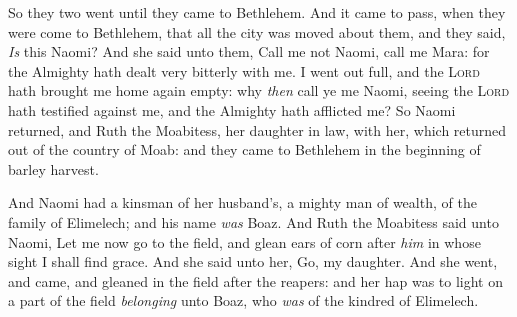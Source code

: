 \documentclass[11pt,letterpaper,oneside]{memoir}
\begin{document}
So they two went until they came to Bethlehem. And it came to pass, when 
they were come to Bethlehem, that all the city was moved about them, and 
they said, \emph{Is} this Naomi? And she said unto them, Call me not 
Naomi, call me Mara: for the Almighty hath dealt very bitterly with me. 
I went out full, and the \textsc{Lord} hath brought me home again empty: 
why \emph{then} call ye me Naomi, seeing the \textsc{Lord} hath 
testified against me, and the Almighty hath afflicted me? So Naomi 
returned, and Ruth the Moabitess, her daughter in law, with her, which 
returned out of the country of Moab: and they came to Bethlehem in the 
beginning of barley harvest. 

And Naomi had a kinsman of her husband's, a mighty man of wealth, of the 
family of Elimelech; and his name \emph{was} Boaz. And Ruth the 
Moabitess said unto Naomi, Let me now go to the field, and glean ears of 
corn after \emph{him} in whose sight I shall find grace. And she said 
unto her, Go, my daughter. And she went, and came, and gleaned in the 
field after the reapers: and her hap was to light on a part of the field 
\emph{belonging} unto Boaz, who \emph{was} of the kindred of Elimelech. 
\end{document}
